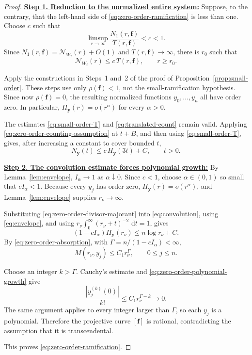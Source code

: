 \documentclass[12pt,letterpaper,reqno]{amsart}
\theoremstyle{definition}
\numberwithin{equation}{section}
\newcommand{\dd}{\,\mathrm d}
\newcommand{\NN}{\mathcal N}
\newcommand{\fv}{\bm f}
\newcommand{\yv}{\bm y}
\begin{document}
\begin{proof}

\medskip\noindent
\textbf{\underline{Step 1. Reduction to the normalized entire system:}}
Suppose, to the contrary, that the left-hand side of
\eqref{eq:zero-order-ramification} is less than one. Choose \(c\) such
that
\[
 \limsup_{r\to\infty}
 \frac{N_1(r,\fv)}{T(r,\fv)}
 <c<1.
\]
Since \(N_1(r,\fv)=\NN_{W_{\fv}}(r)+O(1)\) and
\(T(r,\fv)\to\infty\), there is \(r_0\) such that
\begin{equation}\label{eq:zero-order-counting-assumption}
 \NN_{W_{\fv}}(r)
 \leq
 c\,T(r,\fv),
 \qquad
 r\geq r_0.
\end{equation}

Apply the constructions in Steps~1 and~2 of the proof of
Proposition~\ref{prop:small-order}. These steps use only
\(\rho(\fv)<1\), not the small-ramification hypothesis. Since now
\(\rho(\fv)=0\), the resulting normalized functions
\(y_0,\ldots,y_{n}\) all have order zero. In particular,
\(H_{\yv}(r)=o(r^\alpha)\) for every \(\alpha>0\).

The estimates \eqref{eq:small-order-T} and
\eqref{eq:translated-count} remain valid. Applying
\eqref{eq:zero-order-counting-assumption} at \(t+B\), and then using
\eqref{eq:small-order-T}, gives, after increasing a constant to cover
bounded \(t\),
\begin{equation}\label{eq:zero-order-divisor-majorant}
 N_{\yv}(t)
 \leq
 c\,H_{\yv}(3t)+C,
 \qquad
 t>0.
\end{equation}


\medskip\noindent
\textbf{\underline{Step 2. The convolution estimate forces polynomial growth:}}
By Lemma~\ref{lem:envelope},
\(I_\alpha\to1\) as \(\alpha\downarrow0\). Since \(c<1\), choose
\(\alpha\in(0,1)\) so small that
\(cI_\alpha<1\). Because every \(y_j\) has order zero,
\(H_{\yv}(r)=o(r^\alpha)\), and Lemma~\ref{lem:envelope} supplies
\(r_\nu\to\infty\).

Substituting \eqref{eq:zero-order-divisor-majorant} into
\eqref{eq:convolution}, using \eqref{eq:envelope}, and using
\(r_\nu\int_0^\infty(r_\nu+t)^{-2}\,\dd t=1\), gives
\begin{equation}\label{eq:zero-order-absorption}
 (1-cI_\alpha)H_{\yv}(r_\nu)
 \leq
 n\log r_\nu+C.
\end{equation}
By \eqref{eq:zero-order-absorption}, with
\(\Gamma=n/(1-cI_\alpha)<\infty\),
\begin{equation}\label{eq:zero-order-polynomial-growth}
 M(r_\nu,y_j)
 \leq
 C_1r_\nu^\Gamma,
 \qquad
 0\leq j\leq n.
\end{equation}

Choose an integer \(k>\Gamma\). Cauchy's estimate and
\eqref{eq:zero-order-polynomial-growth} give
\[
 \frac{|y_j^{(k)}(0)|}{k!}
 \leq
 C_1r_\nu^{\Gamma-k}
 \longrightarrow0.
\]
The same argument applies to every integer larger than \(\Gamma\), so
each \(y_j\) is a polynomial. Therefore the projective curve
\([\fv]\) is rational, contradicting the assumption that it is
transcendental.

This proves \eqref{eq:zero-order-ramification}.
\end{proof}
\end{document}
